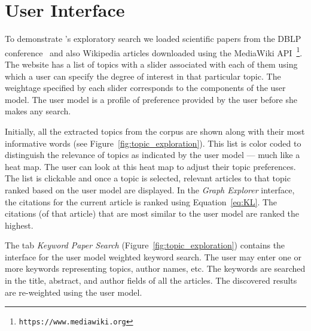 
\section{User Interface}
\label{sec:demo}


To demonstrate \system's exploratory search we loaded scientific 
papers from the DBLP conference~\cite{Tang:2008:EMA:1367497.1367722} 
and also Wikipedia articles downloaded using the MediaWiki API~\footnote{\texttt{https://www.mediawiki.org}}.
The {\system} website has a list of topics with a slider associated 
with each of them using which a user can specify the degree of 
interest in that particular topic. The weightage specified by each 
slider corresponds to the components of the user model. The user 
model is a profile of preference provided by the user before she 
makes any search.

Initially, all the extracted topics from the corpus are shown along 
with their most informative words (see Figure~\ref{fig:topic_exploration}).
This list is color coded to distinguish the relevance of topics as indicated by the user model --- much like a heat map.
The user can look at this heat map to adjust their topic preferences.
The list is clickable and once a topic is selected, relevant articles to that topic ranked based on the user model are displayed.
In the \textsl{Graph Explorer} interface, the citations for the current article is ranked
using Equation~\ref{eq:KL}. The citations (of that article) that are most
similar to the user model are ranked the highest.


The tab \textsl{Keyword Paper Search} (Figure~\ref{fig:topic_exploration}) contains the interface for the user model weighted keyword search.
The user may enter one or more keywords representing topics,  
author names, etc. The keywords are searched in the title, abstract, 
and author fields of all the articles. The discovered results are  
re-weighted using the user model. 

